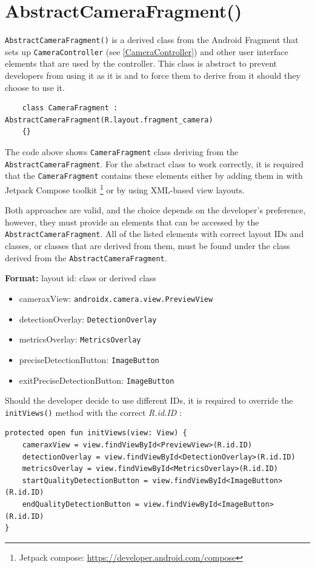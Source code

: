 \section{AbstractCameraFragment()}
\label{AbstractCameraFragment}
\texttt{AbstractCameraFragment()} is a derived class from the Android Fragment that sets up 
\texttt{CameraController} (see \ref{CameraController}) and other user interface elements that are used by the controller. This class is abstract to prevent developers from using it as it is and to force them to derive from it should they choose to use it. 

\bigskip
\begin{lstlisting}
    class CameraFragment : AbstractCameraFragment(R.layout.fragment_camera) 
    {}
\end{lstlisting}
\bigskip

The code above shows \texttt{CameraFragment} class deriving from the \texttt{AbstractCameraFragment}. For the abstract class to work correctly, it is required that the \texttt{CameraFragment} contains these elements either by adding them in with Jetpack Compose toolkit \footnote{Jetpack compose: \url{https://developer.android.com/compose}} or by using XML-based view layouts. 
    
Both approaches are valid, and the choice depends on the developer’s preference, however, they must provide an elements that can be accessed by the \texttt{AbstractCameraFragment}. All of the listed elements with correct layout IDs and classes, or classes that are derived from them, must be found under the class derived from the \texttt{AbstractCameraFragment}.

\bigskip
\begin{minipage}{\textwidth}
\textbf{Format:} layout id: class or derived class

\begin{itemize}
  \item cameraxView: \texttt{androidx.camera.view.PreviewView}
  \item detectionOverlay: \texttt{DetectionOverlay}
  \item metricsOverlay: \texttt{MetricsOverlay}
  \item preciseDetectionButton: \texttt{ImageButton}
  \item exitPreciseDetectionButton: \texttt{ImageButton}
\end{itemize}
\end{minipage}
\bigskip

Should the developer decide to use different IDs, it is required to override the \texttt{initViews()} method with the correct \textit{R.id.ID} :
\bigskip
\begin{lstlisting}
protected open fun initViews(view: View) {
    cameraxView = view.findViewById<PreviewView>(R.id.ID)
    detectionOverlay = view.findViewById<DetectionOverlay>(R.id.ID)
    metricsOverlay = view.findViewById<MetricsOverlay>(R.id.ID)
    startQualityDetectionButton = view.findViewById<ImageButton>(R.id.ID)
    endQualityDetectionButton = view.findViewById<ImageButton>(R.id.ID)
}
\end{lstlisting}
\bigskip

